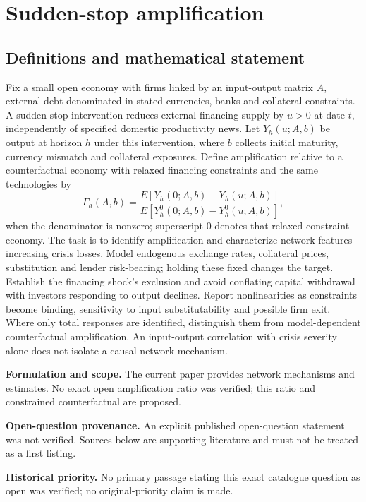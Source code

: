 \documentclass[11pt]{article}
\begin{document}
\section*{Sudden-stop amplification}\label{30007618}
\subsection{Definitions and mathematical statement}
Fix a small open economy with firms linked by an input-output matrix \(A\), external debt denominated in stated currencies, banks and collateral constraints. A sudden-stop intervention reduces external financing supply by \(u>0\) at date \(t\), independently of specified domestic productivity news. Let \(Y_h(u;A,b)\) be output at horizon \(h\) under this intervention, where \(b\) collects initial maturity, currency mismatch and collateral exposures. Define amplification relative to a counterfactual economy with relaxed financing constraints and the same technologies by
\[\Gamma_h(A,b)=\frac{E[Y_h(0;A,b)-Y_h(u;A,b)]}{E[Y_h^0(0;A,b)-Y_h^0(u;A,b)]},\]
when the denominator is nonzero; superscript \(0\) denotes that relaxed-constraint economy. The task is to identify amplification and characterize network features increasing crisis losses. Model endogenous exchange rates, collateral prices, substitution and lender risk-bearing; holding these fixed changes the target. Establish the financing shock's exclusion and avoid conflating capital withdrawal with investors responding to output declines. Report nonlinearities as constraints become binding, sensitivity to input substitutability and possible firm exit. Where only total responses are identified, distinguish them from model-dependent counterfactual amplification. An input-output correlation with crisis severity alone does not isolate a causal network mechanism.

\par\textbf{Formulation and scope.} The current paper provides network mechanisms and estimates. No exact open amplification ratio was verified; this ratio and constrained counterfactual are proposed.

\par\textbf{Open-question provenance.} An explicit published open-question statement was not verified. Sources below are supporting literature and must not be treated as a first listing.

\par\textbf{Historical priority.} No primary passage stating this exact catalogue question as open was verified; no original-priority claim is made.
\end{document}
